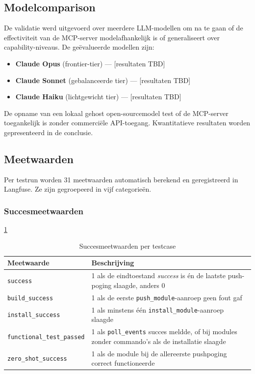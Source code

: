 \subsection{Modelcomparison}\label{subsec:modellen}

De validatie werd uitgevoerd over meerdere LLM-modellen om na te gaan of de effectiviteit van de MCP-server modelafhankelijk is of generaliseert over capability-niveaus. De geëvalueerde modellen zijn:

\begin{itemize}
    \item \textbf{Claude Opus} (frontier-tier) — [resultaten TBD]
    \item \textbf{Claude Sonnet} (gebalanceerde tier) — [resultaten TBD]
    \item \textbf{Claude Haiku} (lichtgewicht tier) — [resultaten TBD]
\end{itemize}

De opname van een lokaal gehost open-sourcemodel test of de MCP-server toegankelijk is zonder commerciële API-toegang. Kwantitatieve resultaten worden gepresenteerd in de conclusie.

\subsection{Meetwaarden}\label{subsec:meetwaarden}

Per testrun worden 31 meetwaarden automatisch berekend en geregistreerd in Langfuse. Ze zijn gegroepeerd in vijf categorieën.

\subsubsection*{Succesmeetwaarden}
\ref{tab:meetwaarden-succes}
\begin{table}[h]
\centering
\begin{tabular}{lp{9cm}}
\hline
\textbf{Meetwaarde} & \textbf{Beschrijving} \\
\hline
\texttt{success} & 1 als de eindtoestand \textit{success} is én de laatste push-poging slaagde, anders 0 \\
\texttt{build\_success} & 1 als de eerste \texttt{push\_module}-aanroep geen fout gaf \\
\texttt{install\_success} & 1 als minstens één \texttt{install\_module}-aanroep slaagde \\
\texttt{functional\_test\_passed} & 1 als \texttt{poll\_events} succes meldde, of bij modules zonder commando’s als de installatie slaagde \\
\texttt{zero\_shot\_success} & 1 als de module bij de allereerste pushpoging correct functioneerde \\
\hline
\end{tabular}
\caption{Succesmeetwaarden per testcase}\label{tab:meetwaarden-succes}
\end{table}

